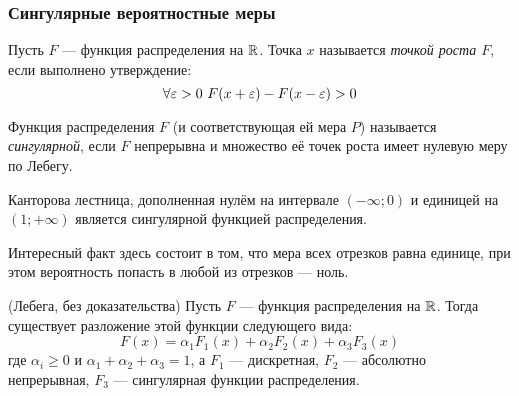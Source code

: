 \subsubsection{Сингулярные вероятностные меры}

\begin{definition}
	Пусть $F$ --- функция распределения на $\mathbb{R}$. Точка $x$ называется \textit{точкой роста $F$}, если выполнено утверждение:
	\[
		\forall \varepsilon > 0\ F(x + \varepsilon) - F(x - \varepsilon) > 0
	\]
\end{definition}

\begin{definition}
	Функция распределения $F$ (и соответствующая ей мера $P$) называется \textit{сингулярной}, если $F$ непрерывна и множество её точек роста имеет нулевую меру по Лебегу.
\end{definition}

\begin{example}
	Канторова лестница, дополненная нулём на интервале $(-\infty; 0)$ и единицей на $(1; +\infty)$ является сингулярной функцией распределения.
	
	Интересный факт здесь состоит в том, что мера всех отрезков равна единице, при этом вероятность попасть в любой из отрезков --- ноль.
\end{example}

\begin{theorem} (Лебега, без доказательства)
	Пусть $F$ --- функция распределения на $\mathbb{R}$. Тогда существует разложение этой функции следующего вида:
	\[
		F(x) = \alpha_1 F_1(x) + \alpha_2 F_2(x) + \alpha_3 F_3(x)
	\]
	где $\alpha_i \ge 0$ и $\alpha_1 + \alpha_2 + \alpha_3 = 1$, а $F_1$ --- дискретная, $F_2$ --- абсолютно непрерывная, $F_3$ --- сингулярная функции распределения.
\end{theorem}